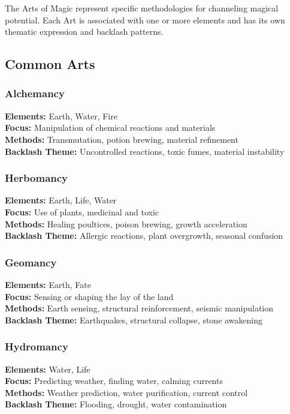 \documentclass[11pt]{report}
\begin{document}
The Arts of Magic represent specific methodologies for channeling magical potential. Each Art is associated with one or more elements and has its own thematic expression and backlash patterns.

\subsection{Common Arts}

\subsubsection{Alchemancy}
\textbf{Elements:} Earth, Water, Fire\\
\textbf{Focus:} Manipulation of chemical reactions and materials\\
\textbf{Methods:} Transmutation, potion brewing, material refinement\\
\textbf{Backlash Theme:} Uncontrolled reactions, toxic fumes, material instability

\subsubsection{Herbomancy}
\textbf{Elements:} Earth, Life, Water\\
\textbf{Focus:} Use of plants, medicinal and toxic\\
\textbf{Methods:} Healing poultices, poison brewing, growth acceleration\\
\textbf{Backlash Theme:} Allergic reactions, plant overgrowth, seasonal confusion

\subsubsection{Geomancy}
\textbf{Elements:} Earth, Fate\\
\textbf{Focus:} Sensing or shaping the lay of the land\\
\textbf{Methods:} Earth sensing, structural reinforcement, seismic manipulation\\
\textbf{Backlash Theme:} Earthquakes, structural collapse, stone awakening

\subsubsection{Hydromancy}
\textbf{Elements:} Water, Life\\
\textbf{Focus:} Predicting weather, finding water, calming currents\\
\textbf{Methods:} Weather prediction, water purification, current control\\
\textbf{Backlash Theme:} Flooding, drought, water contamination
\end{document}
